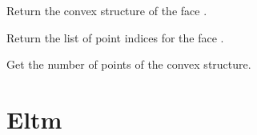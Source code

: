 \documentclass[a4paper,11pt,english]{sphinxmanual}
\begin{document}
\begin{fulllineitems}

\begin{fulllineitems}
\label{\detokenize{python/cmdref_CvStruct:getfem.CvStruct.face}}
Return the convex structure of the face .

\end{fulllineitems}


\begin{fulllineitems}
\label{\detokenize{python/cmdref_CvStruct:getfem.CvStruct.facepts}}
Return the list of point indices for the face .

\end{fulllineitems}


\begin{fulllineitems}
\label{\detokenize{python/cmdref_CvStruct:getfem.CvStruct.nbpts}}
Get the number of points of the convex structure.

\end{fulllineitems}


\end{fulllineitems}



\section{Eltm}
\label{\detokenize{python/cmdref_Eltm:eltm}}\label{\detokenize{python/cmdref_Eltm::doc}}
\end{document}
